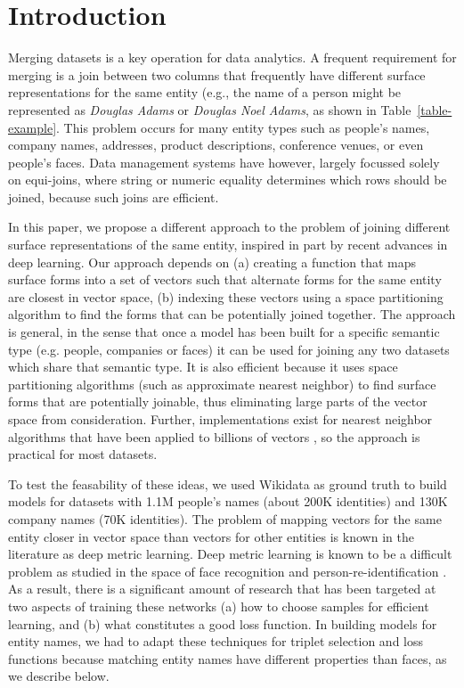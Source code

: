 \section{Introduction}

Merging datasets is a key operation for data analytics. A frequent requirement for merging is a join between two columns that frequently have different surface representations for the same entity (e.g., the name of a person might be represented as \textit{Douglas Adams} or \textit{Douglas Noel Adams}, as shown in Table~\ref{table-example}.  This problem occurs for many entity types such as people's names, company names, addresses, product descriptions, conference venues, or even people's faces.  Data management systems have however, largely focussed solely on equi-joins, where string or numeric equality determines which rows should be joined, because such joins are efficient.

In this paper, we propose a different approach to the problem of joining different surface representations of the same entity, inspired in part by recent advances in deep learning.  Our approach depends on (a) creating a function that maps surface forms into a set of vectors such that alternate forms for the same entity are closest in vector space, (b) indexing these vectors using a space partitioning algorithm to find the forms that can be potentially joined together.  The approach is general, in the sense that once a model has been built for a specific semantic type (e.g. people, companies or faces) it can be used for joining any two datasets which share that semantic type.  It is also efficient because it uses space partitioning algorithms (such as approximate nearest neighbor) to find surface forms that are potentially joinable, thus eliminating large parts of the vector space from consideration.  Further, implementations exist for nearest neighbor algorithms that have been applied to billions of vectors \cite{JDH17}, so the approach is practical for most datasets.  

To test the feasability of these ideas, we used Wikidata as ground truth to build models for datasets with 1.1M people's names (about 200K identities) and 130K company names (70K identities).  The problem of mapping vectors for the same entity closer in vector space than vectors for other entities is known in the literature as deep metric learning.  Deep metric learning is known to be a difficult problem as studied in the space of face recognition and person-re-identification \cite{DBLP:conf/cvpr/SchroffKP15}.  As a result, there is a significant amount of research that has been targeted at two aspects of training these networks (a) how to choose samples for efficient learning, and (b) what constitutes a good loss function.  In building models for entity names, we had to adapt these techniques for triplet selection and loss functions because matching entity names have different properties than faces, as we describe below.

